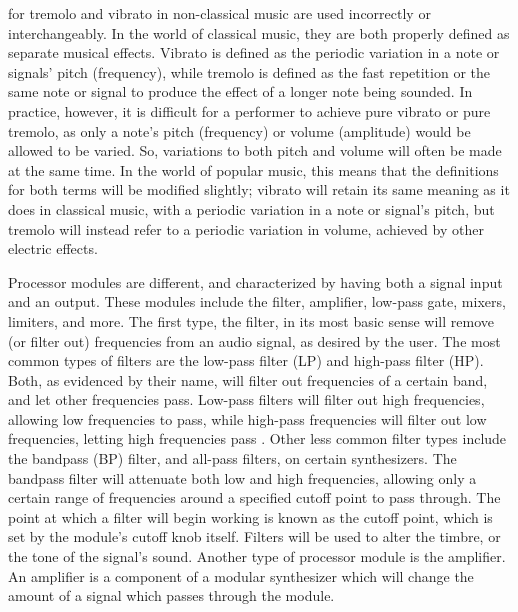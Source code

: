 for tremolo and vibrato in non-classical music are used incorrectly or interchangeably. In the world of classical music, they are both properly defined as separate musical effects. Vibrato is defined as the periodic variation in a note or signals' pitch (frequency), while tremolo is defined as the fast repetition or the same note or signal to produce the effect of a longer note being sounded. In practice, however, it is difficult for a performer to achieve pure vibrato or pure tremolo, as only a note's pitch (frequency) or volume (amplitude) would be allowed to be varied. So, variations to both pitch and volume will often be made at the same time. In the world of popular music, this means that the definitions for both terms will be modified slightly; vibrato will retain its same meaning as it does in classical music, with a periodic variation in a note or signal's pitch, but tremolo will instead refer to a periodic variation in volume, achieved by other electric effects.

Processor modules are different, and characterized by having both a signal input and an output. These modules include the filter, amplifier, low-pass gate, mixers, limiters, and more. The first type, the filter, in its most basic sense will remove (or filter out) frequencies from an audio signal, as desired by the user. The most common types of filters are the low-pass filter (LP) and high-pass filter (HP). Both, as evidenced by their name, will filter out frequencies of a certain band, and let other frequencies pass. Low-pass filters will filter out high frequencies, allowing low frequencies to pass, while high-pass frequencies will filter out low frequencies, letting high frequencies pass \cite{Winer_2018}. Other less common filter types include the bandpass (BP) filter, and all-pass filters, on certain synthesizers. The bandpass filter will attenuate both low and high frequencies, allowing only a certain range of frequencies around a specified cutoff point to pass through. The point at which a filter will begin working is known as the cutoff point, which is set by the module's cutoff knob itself. Filters will be used to alter the timbre, or the tone of the signal's sound. Another type of processor module is the amplifier. An amplifier is a component of a modular synthesizer which will change the amount of a signal which passes through the module. 

